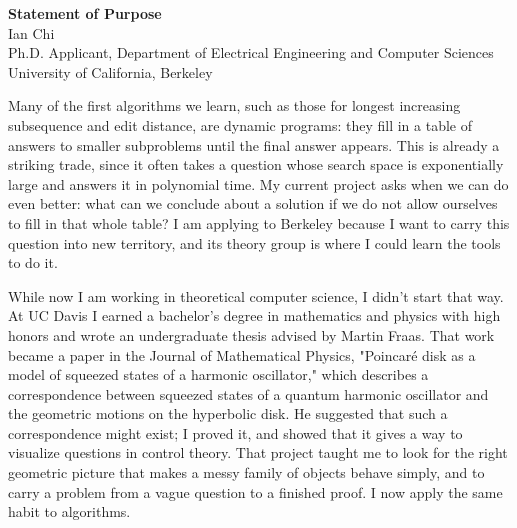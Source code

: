 \documentclass[11pt]{article}
\begin{document}
\begin{center}
  {\Large \textbf{Statement of Purpose}}\\[4pt]
  {\large Ian Chi}\\[2pt]
  Ph.D. Applicant, Department of Electrical Engineering and Computer Sciences\\
  University of California, Berkeley
\end{center}

\vspace{1em}

Many of the first algorithms we learn, such as those for longest increasing subsequence and edit distance, are dynamic programs: they fill in a table of answers to smaller subproblems until the final answer appears. This is already a striking trade, since it often takes a question whose search space is exponentially large and answers it in polynomial time. My current project asks when we can do even better: what can we conclude about a solution if we do not allow ourselves to fill in that whole table? I am applying to Berkeley because I want to carry this question into new territory, and its theory group is where I could learn the tools to do it.

While now I am working in theoretical computer science, I didn't start that way. At UC Davis I earned a bachelor's degree in mathematics and physics with high honors and wrote an undergraduate thesis advised by Martin Fraas. That work became a paper in the Journal of Mathematical Physics, "Poincaré disk as a model of squeezed states of a harmonic oscillator," which describes a correspondence between squeezed states of a quantum harmonic oscillator and the geometric motions on the hyperbolic disk. He suggested that such a correspondence might exist; I proved it, and showed that it gives a way to visualize questions in control theory. That project taught me to look for the right geometric picture that makes a messy family of objects behave simply, and to carry a problem from a vague question to a finished proof. I now apply the same habit to algorithms.
\end{document}
